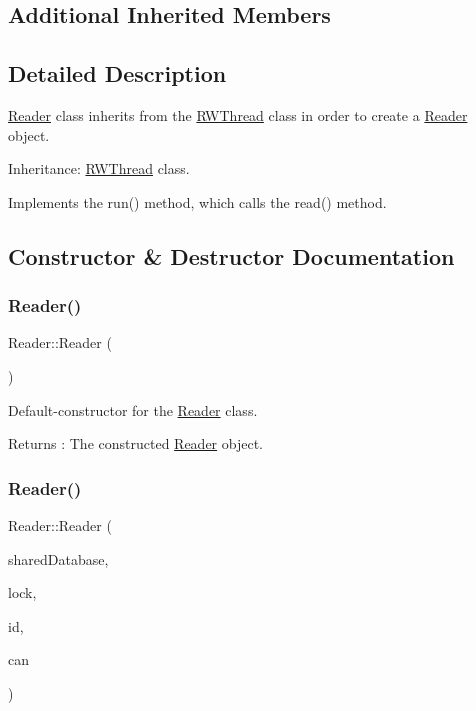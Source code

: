 \subsection*{Additional Inherited Members}


\subsection{Detailed Description}
\hyperlink{class_reader}{Reader} class inherits from the \hyperlink{class_r_w_thread}{R\+W\+Thread} class in order to create a \hyperlink{class_reader}{Reader} object. 

Inheritance\+: \hyperlink{class_r_w_thread}{R\+W\+Thread} class.

Implements the run() method, which calls the read() method. 

\subsection{Constructor \& Destructor Documentation}
\mbox{\label{class_reader_adcda31b507720ab44044d7a21686fba2}} 
\subsubsection{\texorpdfstring{Reader()}{Reader()}\hspace{0.1cm}{\footnotesize\ttfamily [1/2]}}
{\footnotesize\ttfamily Reader\+::\+Reader (\begin{DoxyParamCaption}{ }\end{DoxyParamCaption})}



Default-\/constructor for the \hyperlink{class_reader}{Reader} class. 

\begin{DoxyReturn}{Returns}
\+: The constructed \hyperlink{class_reader}{Reader} object. 
\end{DoxyReturn}
\mbox{\label{class_reader_a5c2576afadd1be193f99fb6d54787b56}} 
\subsubsection{\texorpdfstring{Reader()}{Reader()}\hspace{0.1cm}{\footnotesize\ttfamily [2/2]}}
{\footnotesize\ttfamily Reader\+::\+Reader (\begin{DoxyParamCaption}\item[{\hyperlink{class_r_w_database}{R\+W\+Database}$<$ \hyperlink{classtsgl_1_1_rectangle}{Rectangle} $\ast$$>$ \&}]{shared\+Database,  }\item[{\hyperlink{class_lock}{Lock} \&}]{lock,  }\item[{unsigned long}]{id,  }\item[{\hyperlink{classtsgl_1_1_canvas}{Canvas} \&}]{can }\end{DoxyParamCaption})}



